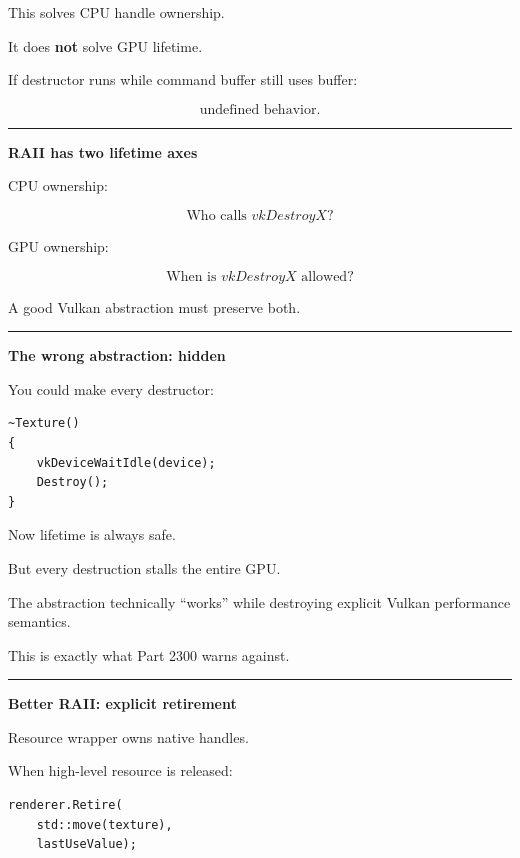This solves CPU handle ownership.

It does \textbf{not} solve GPU lifetime.

If destructor runs while command buffer still uses buffer:

\[
\boxed{\text{undefined behavior}.}
\]

\begin{center}\rule{0.5\linewidth}{0.5pt}\end{center}

\textbf{RAII has two lifetime axes}

CPU ownership:

\[
\boxed{
\text{Who calls }vkDestroyX?
}
\]

GPU ownership:

\[
\boxed{
\text{When is }vkDestroyX\text{ allowed?}
}
\]

A good Vulkan abstraction must preserve both.

\begin{center}\rule{0.5\linewidth}{0.5pt}\end{center}

\textbf{The wrong abstraction: hidden }

You could make every destructor:

\begin{verbatim}
~Texture()
{
    vkDeviceWaitIdle(device);
    Destroy();
}
\end{verbatim}

Now lifetime is always safe.

But every destruction stalls the entire GPU.

The abstraction technically ``works'' while destroying explicit Vulkan performance semantics.

This is exactly what Part 2300 warns against.

\begin{center}\rule{0.5\linewidth}{0.5pt}\end{center}

\textbf{Better RAII: explicit retirement}

Resource wrapper owns native handles.

When high-level resource is released:

\begin{verbatim}
renderer.Retire(
    std::move(texture),
    lastUseValue);
\end{verbatim}

